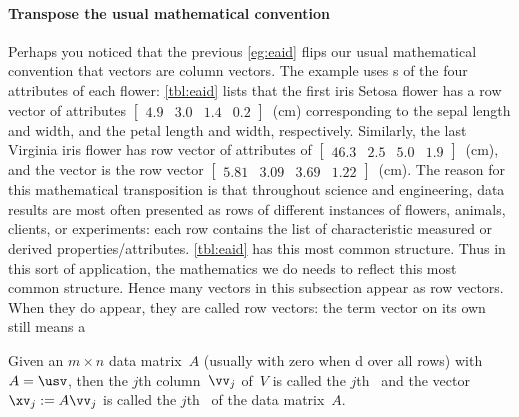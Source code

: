 \paragraph{Transpose the usual mathematical convention}
Perhaps you noticed that the previous \cref{eg:eaid} flips our usual mathematical convention that vectors are column vectors.
The example uses s of the four attributes of each flower: 
\cref{tbl:eaid} lists that the first iris Setosa flower has a row vector of attributes \(\begin{bmatrix} 4.9&3.0&1.4&0.2 \end{bmatrix}\)~(cm) corresponding to the sepal length and width, and the petal length and width, respectively.
Similarly, the last Virginia iris flower has row vector of attributes of \(\begin{bmatrix} 46.3&2.5&5.0&1.9 \end{bmatrix}\)~(cm), and the  vector is the row vector \(\begin{bmatrix} 5.81&3.09&3.69&1.22 \end{bmatrix}\)~(cm).
The reason for this mathematical transposition is that throughout science and engineering, data results are most often presented as rows of different instances of flowers, animals, clients, or experiments: each row contains the list of characteristic measured or derived properties\slash attributes.
\cref{tbl:eaid} has this most common structure.
Thus in this sort of application, the mathematics we do needs to reflect this most common structure.
Hence many vectors in this subsection appear as row vectors.
When they do appear, they are called row vectors: the term vector on its own still means a 




\begin{definition} \label{def:pc}
Given an \(m\times n\) data matrix~\(A\) (usually with zero  when d over all rows) with  \svd\ \(A=\usv\), then the \(j\)th column~\(\vv_j\) of~\(V\) is called the \(j\)th~ and the vector \(\xv_j:=A\vv_j\) is called the \(j\)th~ of the data matrix~\(A\).
\end{definition}



